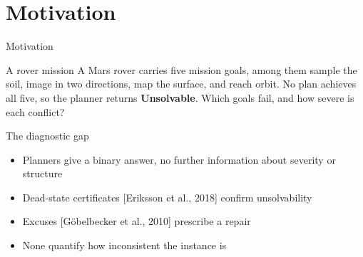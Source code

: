 \section{Motivation}

\begin{frame}{Motivation}
    \begin{exampleblock}{A rover mission}
        A Mars rover carries five mission goals, among them sample the soil, image in two directions, map the surface, and reach orbit. No plan achieves all five, so the planner returns \textbf{Unsolvable}. Which goals fail, and how severe is each conflict?
    \end{exampleblock}

    \begin{alertblock}{The diagnostic gap}
        \begin{itemize}
            \item Planners give a binary answer, no further information about severity or structure
            \item Dead-state certificates [Eriksson et al., 2018] confirm unsolvability
            \item Excuses [G\"obelbecker et al., 2010] prescribe a repair
            \item None quantify how inconsistent the instance is
        \end{itemize}
    \end{alertblock}
\end{frame}
